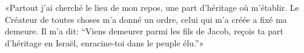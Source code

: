 «Partout j’ai cherché le lieu de mon repos,
	une part d’héritage où m’établir.
Le Créateur de toutes choses m’a donné un ordre,
	celui qui m’a créée a fixé ma demeure.
Il m’a dit: “Viens demeurer parmi les fils de Jacob,
	reçois ta part d’héritage en Israël, enracine-toi dans le peuple élu.”»
